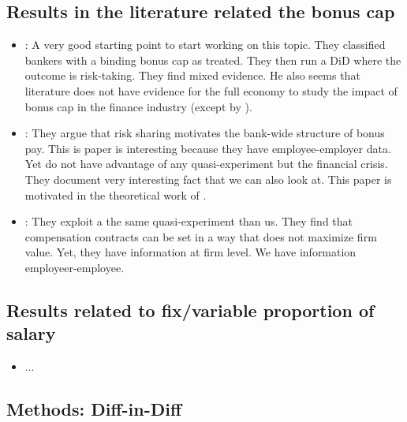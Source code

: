 \documentclass[12pt]{article}
\begin{document}
\subsection{Results in the literature related the bonus cap}

\begin{itemize}		
	\item \citet{colonnello2018effectiveness}:  A very good starting point to start working on this topic. They classified bankers with a binding bonus cap as treated.  They then run a DiD where the outcome is risk-taking.  They find mixed evidence. He also seems that literature does not have evidence for the full economy to study the impact of bonus cap in the finance industry (except by \citet{abudy2020executive}).   
	\item \citet{efing2018bank}: They argue that risk sharing motivates the bank-wide structure of bonus pay. This is paper is interesting because they have employee-employer data. Yet do not have advantage of any quasi-experiment but the financial crisis.  They document very interesting fact that we can also look at. This paper is motivated in the theoretical work of \citet{thanassoulis2012case}.
	\item \citet{abudy2020executive}: They exploit a the same quasi-experiment than us.  They find that compensation
	contracts can be set in a way that does not maximize firm value. Yet, they have information at firm level. We have information employeer-employee. 
	
\end{itemize}


\subsection{Results related to fix/variable proportion of salary}

\begin{itemize}	
	\item ...
	
\end{itemize}




\subsection{Methods: Diff-in-Diff}
\end{document}
